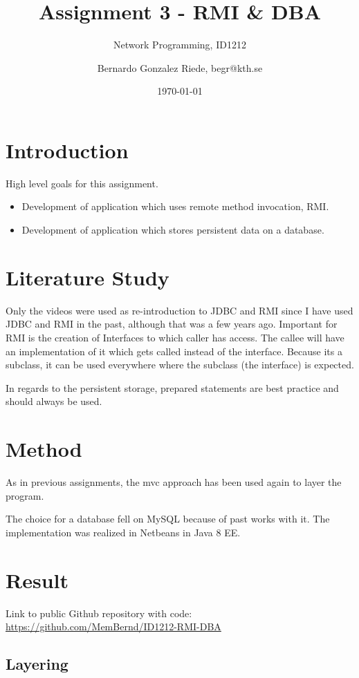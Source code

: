 \documentclass[a4paper]{scrartcl}
\title{Assignment 3 - RMI \& DBA}
\subtitle{Network Programming, ID1212}
\author{Bernardo Gonzalez Riede, begr@kth.se}
\date{\today}
\begin{document}
\maketitle


\section{Introduction}

High level goals for this assignment.
\begin{itemize}
    \item Development of application which uses remote method invocation, RMI.
    \item Development of application which stores persistent data on a database.
\end{itemize}


\section{Literature Study}

Only the videos were used as re-introduction to JDBC and RMI since I have used JDBC and RMI in the past, although that was a few years ago.
Important for RMI is the creation of Interfaces to which caller has access.
The callee will have an implementation of it which gets called instead of the interface.
Because its a subclass, it can be used everywhere where the subclass (the interface) is expected.


In regards to the persistent storage, prepared statements are best practice and should always be used.

\section{Method}
As in previous assignments, the mvc approach has been used again to layer the program.

The choice for a database fell on MySQL because of past works with it.
The implementation was realized in Netbeans in Java 8 EE.


\section{Result}

Link to public Github repository with code:
\href{https://github.com/MemBernd/ID1212-RMI-DBA}{https://github.com/MemBernd/ID1212-RMI-DBA}

\subsection{Layering}
\end{document}
